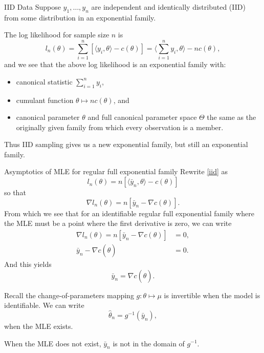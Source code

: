 \documentclass[
  ignorenonframetext,
]{beamer}
\providecommand{\tightlist}{%
  \setlength{\itemsep}{0pt}\setlength{\parskip}{0pt}}
\begin{document}
\begin{frame}{IID Data}
\protect\hypertarget{iid-data}{}
Suppose \(y_1, \ldots, y_n\) are independent and identically distributed
(IID) from some distribution in an exponential family.

The log likelihood for sample size \(n\) is \begin{equation} \label{iid}
    l_n(\theta) = \sum_{i=1}^n\left[\langle y_i,\theta\rangle - c(\theta)\right] 
      = \langle\sum_{i=1}^n y_i, \theta\rangle - n c(\theta),
\end{equation} and we see that the above log likelihood is an
exponential family with:

\begin{itemize}
\tightlist
\item
  canonical statistic \(\sum_{i=1}^n y_i\),
\item
  cumulant function \(\theta \mapsto n c(\theta)\), and
\item
  canonical parameter \(\theta\) and full canonical parameter space
  \(\Theta\) the same as the originally given family from which every
  observation is a member.
\end{itemize}

Thus IID sampling gives us a new exponential family, but still an
exponential family.
\end{frame}

\begin{frame}{Asymptotics of MLE for regular full exponential family}
\protect\hypertarget{asymptotics-of-mle-for-regular-full-exponential-family}{}
Rewrite \eqref{iid} as \[
  l_n(\theta) = n\left[\langle \bar y_n, \theta\rangle - c(\theta)\right]
\] so that \[
  \nabla l_n(\theta) = n\left[\bar y_n - \nabla c(\theta)\right].
\] From which we see that for an identifiable regular full exponential
family where the MLE must be a point where the first derivative is zero,
we can write \begin{align*}
    \nabla l_n(\theta) = n\left[\bar y_n - \nabla c(\theta)\right] &= 0, \\
    \bar y_n - \nabla c(\hat\theta) &= 0.
\end{align*} And this yields \[
  \bar y_n = \nabla c(\hat\theta).
\]
\end{frame}

\begin{frame}{}
\protect\hypertarget{section-3}{}
Recall the change-of-parameters mapping \(g:\theta \mapsto \mu\) is
invertible when the model is identifiable. We can write
\begin{equation} \label{MVPg}
  \hat\theta_n = g^{-1}(\bar y_n),  
\end{equation} when the MLE exists.

When the MLE does not exist, \(\bar y_n\) is not in the domain of
\(g^{-1}\).
\end{frame}
\end{document}
